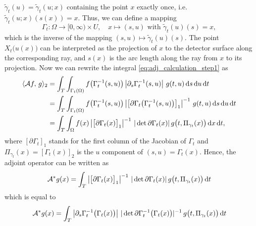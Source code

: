 \documentclass{amsart}
\begin{document}
$\tilde \gamma_t(u) = \tilde \gamma_t(u; x)$ containing the point $x$ exactly once, i.e. $\tilde \gamma_t(u; x)(s(x)) = x$. Thus, we can 
define a 
mapping
%
\begin{equation*}
 \Gamma_t: \Omega \to [0, \infty) \times U,\quad x \mapsto (s, u) \text{ with } \tilde \gamma_t(u)(s) = x,
\end{equation*}
%
which is the inverse of the mapping $(s,u) \mapsto \tilde \gamma_t(u)(s)$. The point $X_t\big(u(x)\big)$ can be interpreted as the 
projection of 
$x$ to the detector surface along the corresponding ray, and $s(x)$ is the arc length along the ray from $x$ to its projection. 
Now we can rewrite the integral \eqref{eq:adj_calculation_step1} as
%
\begin{align*}
 \langle {\ensuremath{\mathcal{A}}} f,\,g\rangle_2
 &= \int_T \int_{\Gamma_t(\Omega)} f\big(\Gamma_t^{-1}(s,u)\big) \left| \partial_s \Gamma_t^{-1}(s,u) \right|\, g(t, u)\, \mathrm{d} s\, \mathrm{d} u\, 
 \mathrm{d} t  \\
 &= \int_T \int_{\Gamma_t(\Omega)} f\big(\Gamma_t^{-1}(s,u)\big) \left| \big[\partial \Gamma_t\big(\Gamma_t^{-1}(s,u)\big)\big]_1 \right|^{-1}\, 
 g(t, u)\, \mathrm{d}  s\, \mathrm{d} u\, \mathrm{d} t \\
 &= \int_T \int_\Omega f(x) \left| \big[\partial \Gamma_t(x)\big]_1 \right|^{-1}\, |\operatorname*{det}{\partial \Gamma_t(x)}|\, 
 g\big(t, \Pi_{\gamma_t}(x)\big)
 \, \mathrm{d} x\, \mathrm{d} t,
\end{align*}
%
where $[\partial \Gamma_t]_1$ stands for the first column of the Jacobian of $\Gamma_t$ and $\Pi_{\gamma_t}(x) = [\Gamma_t(x)]_2$ is the 
$u$ 
component of $(s, u) = \Gamma_t(x)$. Hence, the adjoint operator can be written as
%
\begin{equation}
 \label{eq:adj_op_onedir}
 {\ensuremath{{\mathcal{A}}^*}} g(x) = \int_T \left| \big[\partial \Gamma_t(x)\big]_1 \right|^{-1}\, |\operatorname*{det}{\partial \Gamma_t(x)}|\, g\big(t, 
\Pi_{\gamma_t}(x)\big)\, 
 \mathrm{d} t
\end{equation}
%
which is equal to
%
\begin{equation}
 \label{eq:adj_op_onedir_alt}
 {\ensuremath{{\mathcal{A}}^*}} g(x) = \int_T \left| \partial_s \Gamma_t^{-1}\big(\Gamma_t(x)\big) \right|\, 
 |\operatorname*{det}{\partial \Gamma_t^{-1}\big(\Gamma_t(x)\big)}|^{-1}\, g\big(t, \Pi_{\gamma_t}(x)\big)\, \mathrm{d} t
\end{equation}
%
%
%
\end{document}
